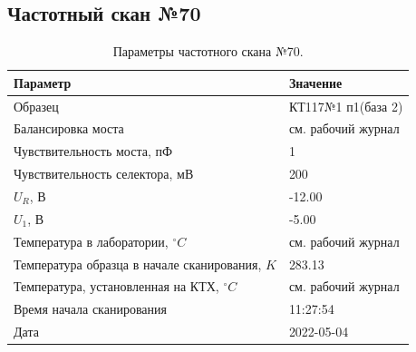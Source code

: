\subsection{Частотный скан №70}
\begin{table}[!ht]
    \centering
    \caption{Параметры частотного скана №70.}
    \begin{tabular}{|l|l|}
        \hline
        Параметр                                       & Значение                  \\ \hline
        Образец                                        & КТ117№1 п1(база 2)        \\ \hline
        Балансировка моста                             & см. рабочий журнал        \\ \hline
        Чувствительность моста, пФ                     & 1                         \\ \hline
        Чувствительность селектора, мВ                 & 200                       \\ \hline
        $U_R$, В                                       & -12.00                    \\ \hline
        $U_1$, В                                       & -5.00                     \\ \hline
        Температура в лаборатории, $^\circ C$          & см. рабочий журнал        \\ \hline
        Температура образца в начале сканирования, $K$ & 283.13                    \\ \hline
        Температура, установленная на КТХ, $^\circ C$  & см. рабочий журнал        \\ \hline
        Время начала сканирования                      & 11:27:54                  \\ \hline
        Дата                                           & 2022-05-04                \\ \hline
    \end{tabular}
    \label{table:frequency_scan_70}
\end{table}


